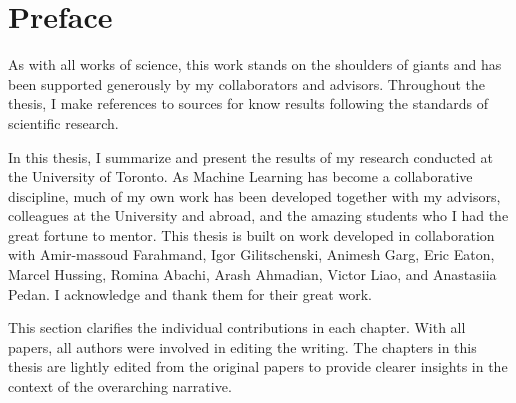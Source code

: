 \chapter*{Preface}

As with all works of science, this work stands on the shoulders of giants and has been supported generously by my collaborators and advisors.
Throughout the thesis, I make references to sources for know results following the standards of scientific research.

In this thesis, I summarize and present the results of my research conducted at the University of Toronto.
As Machine Learning has become a collaborative discipline, much of my own work has been developed together with my advisors, colleagues at the University and abroad, and the amazing students who I had the great fortune to mentor.
This thesis is built on work developed in collaboration with Amir-massoud Farahmand, Igor Gilitschenski, Animesh Garg, Eric Eaton, Marcel Hussing, Romina Abachi, Arash Ahmadian, Victor Liao, and Anastasiia Pedan.
I acknowledge and thank them for their great work.

This section clarifies the individual contributions in each chapter. With all papers, all authors were involved in editing the writing.
The chapters in this thesis are lightly edited from the original papers to provide clearer insights in the context of the overarching narrative.

